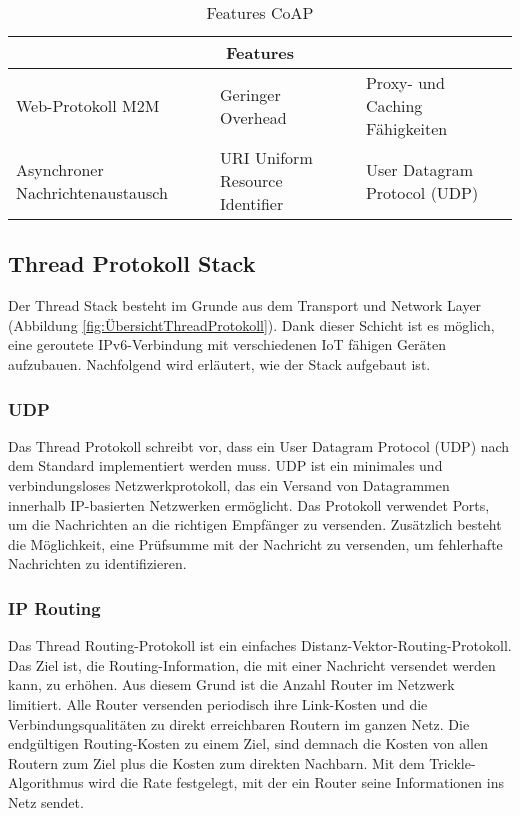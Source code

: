 \begin{table}[H]
	\centering
	\begin{adjustbox}{width=1\textwidth}
		\begin{tabular}{@{}|l|l|l|@{}}
			\toprule
			\multicolumn{3}{|c|}{\textbf{Features}}                                                             \\ \midrule
			Web-Protokoll M2M                & Geringer Overhead               & Proxy- und Caching Fähigkeiten \\ \midrule
			Asynchroner Nachrichtenaustausch & URI Uniform Resource Identifier & User Datagram  Protocol  (UDP) \\ \bottomrule
		\end{tabular}
	\end{adjustbox}
	\caption{Features CoAP}
	\label{table:FeaturesCoAP}
\end{table}
\newpage


\subsection{Thread Protokoll Stack}\label{subsec:ThreadProtokollStack}
Der Thread Stack besteht im Grunde aus dem Transport und Network Layer (Abbildung \ref{fig:ÜbersichtThreadProtokoll}). Dank dieser Schicht ist es möglich, eine geroutete IPv6-Verbindung mit verschiedenen IoT fähigen Geräten aufzubauen. Nachfolgend wird erläutert, wie der Stack aufgebaut ist.

\subsubsection{UDP}\label{subsubsec:UDP}
Das Thread Protokoll schreibt vor, dass ein User Datagram Protocol (UDP) nach dem Standard \cite{postel_user_1980} implementiert werden muss. UDP ist ein minimales und verbindungsloses Netzwerkprotokoll, das ein Versand von Datagrammen innerhalb IP-basierten Netzwerken ermöglicht. Das Protokoll verwendet Ports, um die Nachrichten an die richtigen Empfänger zu versenden. Zusätzlich besteht die Möglichkeit, eine Prüfsumme mit der Nachricht zu versenden, um fehlerhafte Nachrichten zu identifizieren. \cite[Seite 6-2]{thread_group_inc_thread_2017}

\subsubsection{IP Routing}\label{subsubsec:IPRouting}
Das Thread Routing-Protokoll ist ein einfaches Distanz-Vektor-Routing-Protokoll. Das Ziel ist, die Routing-Information, die mit einer Nachricht versendet werden kann, zu erhöhen. Aus diesem Grund ist die Anzahl Router im Netzwerk limitiert. Alle Router versenden periodisch ihre Link-Kosten und die Verbindungsqualitäten zu direkt erreichbaren Routern im ganzen Netz. Die endgültigen Routing-Kosten zu einem Ziel, sind demnach die Kosten von allen Routern zum Ziel plus die Kosten zum direkten Nachbarn. Mit dem Trickle-Algorithmus \cite{levis_trickle_2011} wird die Rate festgelegt, mit der ein Router seine Informationen ins Netz sendet. \cite[Seite 5-23]{thread_group_inc_thread_2017}

